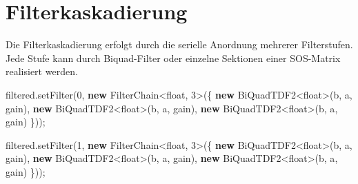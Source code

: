 \documentclass[
  ngerman,
  letterpaper,
  DIV=11]{scrreprt}
\newenvironment{Shaded}{\begin{snugshade}}{\end{snugshade}}
\newcommand{\DataTypeTok}[1]{\textcolor[rgb]{0.68,0.00,0.00}{#1}}
\newcommand{\DecValTok}[1]{\textcolor[rgb]{0.68,0.00,0.00}{#1}}
\newcommand{\KeywordTok}[1]{\textcolor[rgb]{0.00,0.23,0.31}{\textbf{#1}}}
\newcommand{\NormalTok}[1]{\textcolor[rgb]{0.00,0.23,0.31}{#1}}
\newcommand{\OperatorTok}[1]{\textcolor[rgb]{0.37,0.37,0.37}{#1}}
\begin{document}
\section{Filterkaskadierung}\label{filterkaskadierung-1}

Die Filterkaskadierung erfolgt durch die serielle Anordnung mehrerer
Filterstufen. Jede Stufe kann durch Biquad-Filter oder einzelne
Sektionen einer SOS-Matrix realisiert werden.

\begin{Shaded}
\begin{Highlighting}[]
\NormalTok{filtered}\OperatorTok{.}\NormalTok{setFilter}\OperatorTok{(}\DecValTok{0}\OperatorTok{,} \KeywordTok{new}\NormalTok{ FilterChain}\OperatorTok{\textless{}}\DataTypeTok{float}\OperatorTok{,} \DecValTok{3}\OperatorTok{\textgreater{}(\{}
                      \KeywordTok{new}\NormalTok{ BiQuadTDF2}\OperatorTok{\textless{}}\DataTypeTok{float}\OperatorTok{\textgreater{}(}\NormalTok{b}\OperatorTok{,}\NormalTok{ a}\OperatorTok{,}\NormalTok{ gain}\OperatorTok{),}
                      \KeywordTok{new}\NormalTok{ BiQuadTDF2}\OperatorTok{\textless{}}\DataTypeTok{float}\OperatorTok{\textgreater{}(}\NormalTok{b}\OperatorTok{,}\NormalTok{ a}\OperatorTok{,}\NormalTok{ gain}\OperatorTok{),}
                      \KeywordTok{new}\NormalTok{ BiQuadTDF2}\OperatorTok{\textless{}}\DataTypeTok{float}\OperatorTok{\textgreater{}(}\NormalTok{b}\OperatorTok{,}\NormalTok{ a}\OperatorTok{,}\NormalTok{ gain}\OperatorTok{)}
\OperatorTok{\}));}

\NormalTok{filtered}\OperatorTok{.}\NormalTok{setFilter}\OperatorTok{(}\DecValTok{1}\OperatorTok{,} \KeywordTok{new}\NormalTok{ FilterChain}\OperatorTok{\textless{}}\DataTypeTok{float}\OperatorTok{,} \DecValTok{3}\OperatorTok{\textgreater{}(\{}
                      \KeywordTok{new}\NormalTok{ BiQuadTDF2}\OperatorTok{\textless{}}\DataTypeTok{float}\OperatorTok{\textgreater{}(}\NormalTok{b}\OperatorTok{,}\NormalTok{ a}\OperatorTok{,}\NormalTok{ gain}\OperatorTok{),}
                      \KeywordTok{new}\NormalTok{ BiQuadTDF2}\OperatorTok{\textless{}}\DataTypeTok{float}\OperatorTok{\textgreater{}(}\NormalTok{b}\OperatorTok{,}\NormalTok{ a}\OperatorTok{,}\NormalTok{ gain}\OperatorTok{),}
                      \KeywordTok{new}\NormalTok{ BiQuadTDF2}\OperatorTok{\textless{}}\DataTypeTok{float}\OperatorTok{\textgreater{}(}\NormalTok{b}\OperatorTok{,}\NormalTok{ a}\OperatorTok{,}\NormalTok{ gain}\OperatorTok{)}
\OperatorTok{\}));}
\end{Highlighting}
\end{Shaded}
\end{document}
